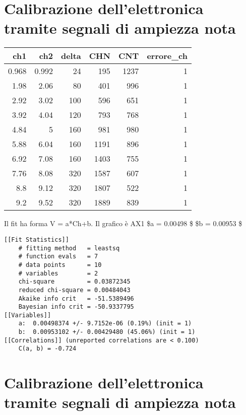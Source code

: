 \hypertarget{calibrazione-dellelettronica-tramite-segnali-di-ampiezza-nota}{%
\section{Calibrazione dell'elettronica tramite segnali di ampiezza
nota}\label{calibrazione-dellelettronica-tramite-segnali-di-ampiezza-nota}}

\begin{longtable}[]{@{}rrrrrr@{}}
\toprule
ch1 & ch2 & delta & CHN & CNT & errore\_ch \\
\midrule
\endhead
0.968 & 0.992 & 24 & 195 & 1237 & 1 \\
1.98 & 2.06 & 80 & 401 & 996 & 1 \\
2.92 & 3.02 & 100 & 596 & 651 & 1 \\
3.92 & 4.04 & 120 & 793 & 768 & 1 \\
4.84 & 5 & 160 & 981 & 980 & 1 \\
5.88 & 6.04 & 160 & 1191 & 896 & 1 \\
6.92 & 7.08 & 160 & 1403 & 755 & 1 \\
7.76 & 8.08 & 320 & 1587 & 607 & 1 \\
8.8 & 9.12 & 320 & 1807 & 522 & 1 \\
9.2 & 9.52 & 320 & 1889 & 839 & 1 \\
\bottomrule
\end{longtable}

Il fit ha forma V = a*Ch+b. Il grafico è AX1 
\$a = 0.00498 \$ 
\$b = 0.00953  \$

\begin{verbatim}
[[Fit Statistics]]
    # fitting method   = leastsq
    # function evals   = 7
    # data points      = 10
    # variables        = 2
    chi-square         = 0.03872345
    reduced chi-square = 0.00484043
    Akaike info crit   = -51.5389496
    Bayesian info crit = -50.9337795
[[Variables]]
    a:  0.00498374 +/- 9.7152e-06 (0.19%) (init = 1)
    b:  0.00953102 +/- 0.00429480 (45.06%) (init = 1)
[[Correlations]] (unreported correlations are < 0.100)
    C(a, b) = -0.724 
\end{verbatim}

\hypertarget{calibrazione-dellelettronica-tramite-segnali-di-ampiezza-nota-1}{%
\section{Calibrazione dell'elettronica tramite segnali di ampiezza
nota}\label{calibrazione-dellelettronica-tramite-segnali-di-ampiezza-nota-1}}

